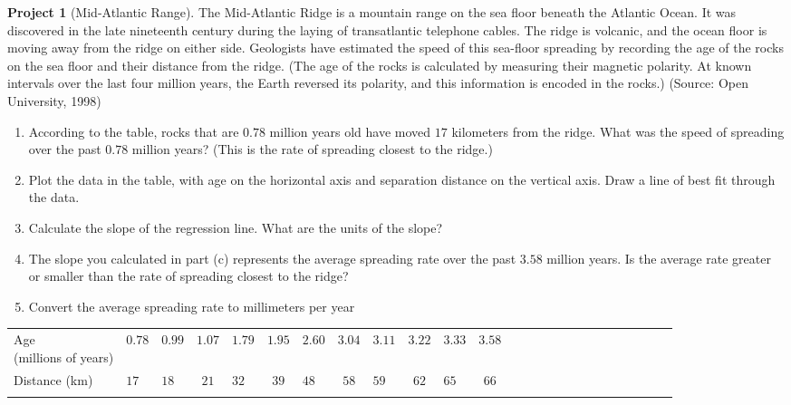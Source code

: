 \documentclass[10pt,]{book}
\makeatletter
\theoremstyle{plain}
\theoremstyle{definition}
\theoremstyle{definition}
\newtheorem{project}{Project}[chapter]
\theoremstyle{definition}
\theoremstyle{definition}
\numberwithin{equation}{part}
\newcommand{\hrulethin}  {\noalign{\hrule height 0.04em}}
\newcommand{\tablecelllines}[3]%
{\begin{tabular}[#2]{@{}#1@{}}#3\end{tabular}}
\makeatother
\begin{document}
\begin{project}[Mid-Atlantic Range]\label{project-4}
The Mid-Atlantic Ridge is a mountain range on the sea floor beneath the Atlantic Ocean. It was discovered in the late nineteenth century during the laying of transatlantic telephone cables. The ridge is volcanic, and the ocean floor is moving away from the ridge on either side. Geologists have estimated the speed of this sea-floor spreading by recording the age of the rocks on the sea floor and their distance from the ridge. (The age of the rocks is calculated by measuring their magnetic polarity. At known intervals over the last four million years, the Earth reversed its polarity, and this information is encoded in the rocks.) (Source: Open University, 1998) \leavevmode%
\begin{enumerate}[label=*\alph**]
\item\hypertarget{li-1710}{}According to the table, rocks that are \(0.78\) million years old have moved \(17\) kilometers from the ridge. What was the speed of spreading over the past \(0.78\) million years? (This is the rate of spreading closest to the ridge.)%
\item\hypertarget{li-1711}{}Plot the data in the table, with age on the horizontal axis and separation distance on the vertical axis. Draw a line of best fit through the data.%
\item\hypertarget{li-1712}{}Calculate the slope of the regression line. What are the units of the slope?%
\item\hypertarget{li-1713}{}The slope you calculated in part (c) represents the average spreading rate over the past \(3.58\) million years. Is the average rate greater or smaller than the rate of spreading closest to the ridge?%
\item\hypertarget{li-1714}{}Convert the average spreading rate to millimeters per year%
\end{enumerate}
 \begin{table}
\centering
\begin{tabular}{AlAcAcAcAcAcAcAcAcAcAcAcA}\hrulethin
\tablecelllines{l}{m}
{Age\\
(millions of years)}
&\(0.78\)&\(0.99\)&\(1.07\)&\(1.79\)&\(1.95\)&\(2.60\)&\(3.04\)&\(3.11\)&\(3.22\)&\(3.33\)&\(3.58\)\tabularnewline\hrulethin
Distance (km)&\(17\)&\(18\)&\(21\)&\(32\)&\(39\)&\(48\)&\(58\)&\(59\)&\(62\)&\(65\)&\(66\)\tabularnewline\hrulethin
\end{tabular}
\end{table}
%
\end{project}
\end{document}
